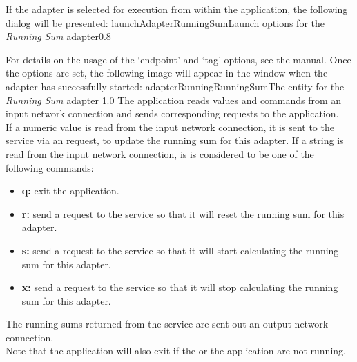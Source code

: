 \insertStandardAdapterCommands
\condPage{}
If the adapter is selected for execution from within the \emph{\MMMU} application, the
following dialog will be presented:
%
{launchAdapterRunningSum}{Launch options for the \emph{Running Sum} adapter}{0.8}

For details on the usage of the `endpoint' and `tag' options, see the \emph{\MMMU} manual.
Once the options are set, the following image will appear in the \emph{\MMMU} window when
the adapter has successfully started:
%
{adapterRunningRunningSum}{The \emph{\MMMU} entity for the \emph{Running Sum} adapter}%
{1.0}
\condPage
{}
The  application reads  values and
commands from an input \yarp{} network connection and sends corresponding requests to the
 application.\\

If a numeric value is read from the input \yarp{} network connection, it is sent to the
service via an  request, to update the running
sum for this adapter.
If a string is read from the input \yarp{} network connection, is is considered to be one
of the following commands:
\begin{itemize}
\item\textbf{q:} exit the application.
\item\exSp\textbf{r:} send a  request to the
service so that it will reset the running sum for this adapter.
\item\exSp\textbf{s:} send a  request to the
service so that it will start calculating the running sum for this adapter.
\item\exSp\textbf{x:} send a  request to the
service so that it will stop calculating the running sum for this adapter.
\end{itemize}
The running sums returned from the service are sent out an output \yarp{} network
connection.\\

Note that the application will also exit if the  or the
 application are not running.\\


